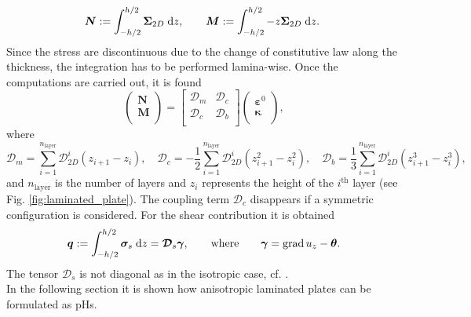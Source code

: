 \begin{equation}
	\begin{aligned}
	\bm{N} := \int_{-h/2}^{h/2} \bm{\Sigma}_{2D} \d{z}, \qquad 
	\bm{M} := \int_{-h/2}^{h/2} - z \bm{\Sigma}_{2D} \d{z}. \
	\end{aligned}
\end{equation}
Since the stress are discontinuous due to the change of constitutive law along the thickness, the integration has to be performed lamina-wise. Once the computations are carried out, it is found
\begin{equation}\label{eq:NM_laminated}
\begin{pmatrix}
\bm{N} \\ \bm{M} \\ 
\end{pmatrix} = 
\begin{bmatrix}
\bm{\mathcal{D}}_{m} & \bm{\mathcal{D}}_{c} \\
\bm{\mathcal{D}}_{c} & \bm{\mathcal{D}}_{b} \\
\end{bmatrix}
\begin{pmatrix}
\bm{\varepsilon}^0 \\ \bm{\kappa} \\ 
\end{pmatrix},
\end{equation}
where
\begin{equation}
	\bm{\mathcal{D}}_{m} = \sum_{i = 1}^{n_{\text{layer}}} \bm{\mathcal{D}}_{2D}^i (z_{i+1}-z_{i}), \quad \bm{\mathcal{D}}_{c} = -\frac{1}{2}\sum_{i = 1}^{n_{\text{layer}}} \bm{\mathcal{D}}_{2D}^i (z_{i+1}^2-z_{i}^2), \quad \bm{\mathcal{D}}_{b} = \frac{1}{3} \sum_{i = 1}^{n_{\text{layer}}} \bm{\mathcal{D}}_{2D}^i (z_{i+1}^3-z_{i}^3),
\end{equation}
and $n_{\text{layer}}$ is the number of layers and $z_i$ represents the height of the $i^{\text{th}}$ layer (see Fig. \ref{fig:laminated_plate}). The coupling term $\bm{\mathcal{D}}_{c}$ disappears if a symmetric configuration is considered. For the shear contribution it is obtained
\begin{equation}\label{eq:q_laminated}
	\bm{q} := \int_{-h/2}^{h/2} \bm{\sigma}_{s} \d{z} = \bm{\mathcal{D}}_s \bm{\gamma}, \where \bm{\gamma}= \grad u_z - \bm{\theta}.
\end{equation} 
The tensor $\bm{\mathcal{D}}_s$ is not diagonal as in the isotropic case, cf. . \\

 In the following section it is shown how anisotropic laminated plates can be formulated as pHs.

